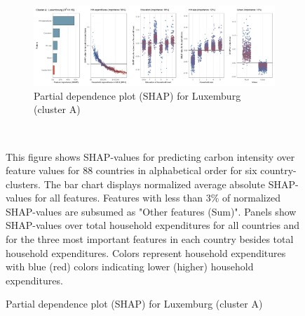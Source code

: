 \begin{figure}[ht!]
    \\
    \vspace{0.5cm}
   \begin{subfigure}[b]{\textwidth}
   \centering
         \caption{Partial dependence plot (SHAP) for Luxemburg (cluster A)}
         \label{fig:5b_LUX}
         \includegraphics[width=\textwidth]{Figure 5b/Figure_5b_LUX}
         \end{subfigure}
    \\
    \vspace{0.5cm}
   
    \begin{subcaption2}
     This figure shows SHAP-values for predicting carbon intensity over feature values for 88 countries in alphabetical order for six country-clusters. The bar chart displays normalized average absolute SHAP-values for all features. Features with less than 3\% of normalized SHAP-values are subsumed as "Other features (Sum)". Panels show SHAP-values over total household expenditures for all countries and for the three most important features in each country besides total household expenditures. Colors represent household expenditures with blue (red) colors indicating lower (higher) household expenditures.
     \end{subcaption2}
\end{figure}

